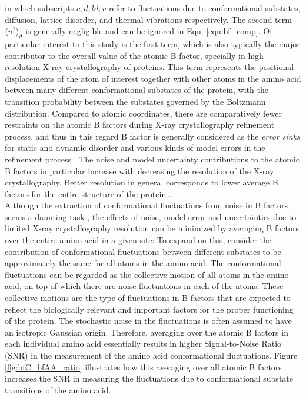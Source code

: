 \documentclass[11pt]{article}
\begin{document}
\begin{appendices}
    \noindent in which subscripts $c, d, ld, v$ refer to fluctuations due to conformational substates, diffusion, lattice disorder, and thermal vibrations respectively. The second term $\langle u^2 \rangle_d$ is generally negligible and can be ignored in Eqn. \ref{eqn:bf_comp}. Of particular interest to this study is the first term, which is also typically the major contributor to the overall value of the atomic B factor, specially in high-resolution X-ray crystallography of proteins. This term represents the positional displacements of the atom of interest together with other atoms in the amino acid between many different conformational substates of the protein, with the transition probability between the substates governed by the Boltzmann distribution. Compared to atomic coordinates, there are comparatively fewer restraints on the atomic B factors during X-ray crystallography refinement process, and thus in this regard B factor is generally considered as the {\it error sinks} for static and dynamic disorder and various kinds of model errors in the refinement process \cite{read_structure-factor_1990}. The noise and model uncertainty contributions to the atomic B factors in particular increase with decreasing the resolution of the X-ray crystallography. Better resolution in general corresponds to lower average B factors for the entire structure of the protein \cite{read_structure-factor_1990}. \\

    Although the extraction of conformational fluctuations from noise in B factors seems a daunting task \cite{read_structure-factor_1990}, the effects of noise, model error and uncertainties due to limited X-ray crystallography resolution can be minimized by averaging B factors over the entire amino acid in a given site: To expand on this, consider the contribution of conformational fluctuations between different substates to be approximately the same for all atoms in the amino acid. The conformational fluctuations can be regarded as the collective motion of all atoms in the amino acid, on top of which there are noise fluctuations in each of the atoms. These collective motions are the type of fluctuations in B factors that are expected to reflect the biologically relevant and important factors for the proper functioning of the protein. The stochastic noise in the fluctuations is often assumed to have an isotropic Gaussian origin. Therefore, averaging over the atomic B factors in each individual amino acid essentially results in higher Signal-to-Noise Ratio (SNR) in the measurement of the amino acid conformational fluctuations. Figure \ref{fig:bfC_bfAA_ratio} illustrates how this averaging over all atomic B factors increases the SNR in measuring the fluctuations due to conformational substate transitions of the amino acid. \\


\end{appendices}
\end{document}
